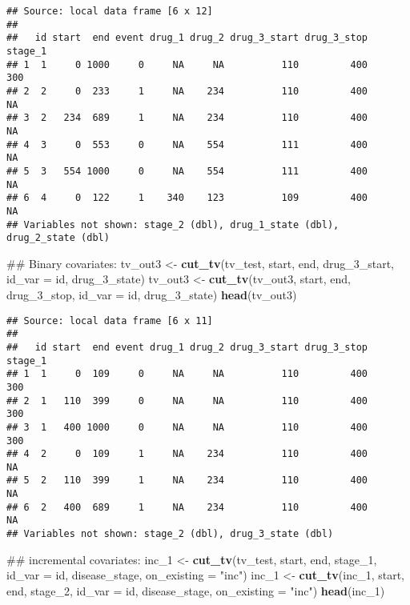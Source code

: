 \documentclass[]{article}
\newenvironment{Shaded}{\begin{snugshade}}{\end{snugshade}}
\newcommand{\KeywordTok}[1]{\textcolor[rgb]{0.13,0.29,0.53}{\textbf{{#1}}}}
\newcommand{\DataTypeTok}[1]{\textcolor[rgb]{0.13,0.29,0.53}{{#1}}}
\newcommand{\StringTok}[1]{\textcolor[rgb]{0.31,0.60,0.02}{{#1}}}
\newcommand{\NormalTok}[1]{{#1}}
\begin{document}
\begin{verbatim}
## Source: local data frame [6 x 12]
## 
##   id start  end event drug_1 drug_2 drug_3_start drug_3_stop stage_1
## 1  1     0 1000     0     NA     NA          110         400     300
## 2  2     0  233     1     NA    234          110         400      NA
## 3  2   234  689     1     NA    234          110         400      NA
## 4  3     0  553     0     NA    554          111         400      NA
## 5  3   554 1000     0     NA    554          111         400      NA
## 6  4     0  122     1    340    123          109         400      NA
## Variables not shown: stage_2 (dbl), drug_1_state (dbl), drug_2_state (dbl)
\end{verbatim}

\begin{Shaded}
\begin{Highlighting}[]
\NormalTok{## Binary covariates:}
\NormalTok{tv_out3 <-}\StringTok{ }\KeywordTok{cut_tv}\NormalTok{(tv_test, start, end, drug_3_start, }\DataTypeTok{id_var =} \NormalTok{id, drug_3_state)}
\NormalTok{tv_out3 <-}\StringTok{ }\KeywordTok{cut_tv}\NormalTok{(tv_out3, start, end, drug_3_stop, }\DataTypeTok{id_var =} \NormalTok{id, drug_3_state)}
\KeywordTok{head}\NormalTok{(tv_out3)}
\end{Highlighting}
\end{Shaded}

\begin{verbatim}
## Source: local data frame [6 x 11]
## 
##   id start  end event drug_1 drug_2 drug_3_start drug_3_stop stage_1
## 1  1     0  109     0     NA     NA          110         400     300
## 2  1   110  399     0     NA     NA          110         400     300
## 3  1   400 1000     0     NA     NA          110         400     300
## 4  2     0  109     1     NA    234          110         400      NA
## 5  2   110  399     1     NA    234          110         400      NA
## 6  2   400  689     1     NA    234          110         400      NA
## Variables not shown: stage_2 (dbl), drug_3_state (dbl)
\end{verbatim}

\begin{Shaded}
\begin{Highlighting}[]
\NormalTok{## incremental covariates:}
\NormalTok{inc_1 <-}\StringTok{ }\KeywordTok{cut_tv}\NormalTok{(tv_test, start, end, stage_1, }\DataTypeTok{id_var =} \NormalTok{id, disease_stage, }
                \DataTypeTok{on_existing =} \StringTok{"inc"}\NormalTok{)}
\NormalTok{inc_1 <-}\StringTok{ }\KeywordTok{cut_tv}\NormalTok{(inc_1, start, end, stage_2, }\DataTypeTok{id_var =} \NormalTok{id, disease_stage, }
                \DataTypeTok{on_existing =} \StringTok{"inc"}\NormalTok{)}
\KeywordTok{head}\NormalTok{(inc_1)}
\end{Highlighting}
\end{Shaded}
\end{document}
